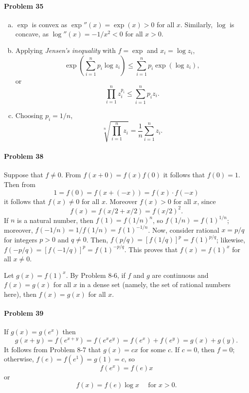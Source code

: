 \documentclass{article}
\begin{document}
\paragraph{Problem 35}
\begin{enumerate}[(a)]
  \item $\exp$ is convex as $\exp''(x) = \exp(x) > 0$ for all $x$. Similarly,
    $\log$ is concave, as $\log''(x) = -1/x^2 < 0$ for all $x > 0$.
  \item Applying \emph{Jensen's inequality} with $f = \exp$ and $x_i = \log
    z_i$, \[
      \exp\left(\sum_{i=1}^n p_i\log z_i\right)
      \leq \sum_{i=1}^n p_i\exp(\log z_i),
    \] or \[
      \prod_{i=1}^n z_i^{p_i} \leq \sum_{i=1}^n p_iz_i.
    \]
  \item Choosing $p_i = 1/n$, \[
      \sqrt[n]{\prod_{i=1}^n z_i} = \frac{1}{n}\sum_{i=1}^n z_i.
    \]
\end{enumerate}

\paragraph{Problem 38} Suppose that $f \neq 0$. From $f(x + 0) = f(x)f(0)$ it
follows that $f(0) = 1$. Then from \[
  1 = f(0) = f(x + (-x)) = f(x) \cdot f(-x)
\] it follows that $f(x) \neq 0$ for all $x$. Moreover $f(x) > 0$ for all $x$,
since \[
  f(x) = f(x/2 + x/2) = f(x/2)^2.
\] If $n$ is a natural number, then $f(1) = f(1/n)^n$, so $f(1/n) =
f(1)^{1/n}$; moreover, $f(-1/n) = 1/f(1/n) = f(1)^{-1/n}$. Now, consider
rational $x = p/q$ for integers $p > 0$ and $q \neq 0$. Then, $f(p/q) =
[f(1/q)]^p = f(1)^{p/q}$; likewise, $f(-p/q) = [f(-1/q)]^p = f(1)^{-p/q}$. This
proves that $f(x) = f(1)^x$ for all $x \neq 0$.

Let $g(x) = f(1)^x$. By Problem 8-6, if $f$ and $g$ are continuous and $f(x) =
g(x)$ for all $x$ in a dense set (namely, the set of rational numbers here),
then $f(x) = g(x)$ for all $x$.

\paragraph{Problem 39} If $g(x) = g(e^x)$ then \[
  g(x + y) = f(e^{x + y}) = f(e^xe^y) = f(e^x) + f(e^y) = g(x) + g(y).
\] It follows from Problem 8-7 that $g(x) = cx$ for some $c$. If $c = 0$, then
$f = 0$; otherwise, $f(e) = f(e^1) = g(1) = c$, so \[
  f(e^x) = f(e)x
\] or \[
  f(x) = f(e)\log x\quad \text{ for } x > 0.
\]
\end{document}
